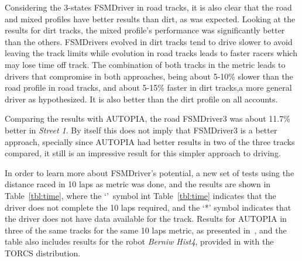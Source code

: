Considering the 3-states FSMDriver in road tracks, it is also clear that the road and mixed profiles have better results than dirt, as was expected.  Looking at the results for dirt tracks, the mixed profile's performance was significantly better than the others. FSMDrivers evolved in dirt tracks tend to drive slower to avoid leaving the track limits while evolution in road tracks leads to faster racers which may lose time off track. The combination of both tracks in the metric leads to drivers that compromise in both approaches, being about 5-10\% slower than the road profile in road tracks, and about 5-15\% faster in dirt tracks,a more general driver as hypothesized. It is also better than the dirt profile on all accounts.

Comparing the results with AUTOPIA, the road FSMDriver3 was about 11.7\% better in \emph{Street 1}. By itself this does not imply that FSMDriver3 is a better approach, specially since AUTOPIA had better results in two of the three tracks compared, it still is an impressive result for this simpler approach to driving.

In order to learn more about FSMDriver's potential, a new set of tests using the distance raced in 10 laps as metric was done, and the results are shown in Table~\ref{tbl:time}, where the `\textdagger'~symbol int Table~\ref{tbl:time} indicates that the driver does not complete the 10 laps required, and the `*' symbol indicates that the driver does not have data available for the track. Results for AUTOPIA in three of the same tracks for the same 10 laps metric, as presented in~\cite{AUTOPIA}, and the table also includes results for the robot \emph{Berniw Hist4}, provided in with the TORCS distribution. 


